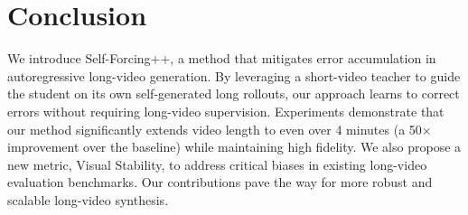 \section{Conclusion}
We introduce Self-Forcing++, a method that mitigates error accumulation in autoregressive long-video generation. By leveraging a short-video teacher to guide the student on its own self-generated long rollouts, our approach learns to correct errors without requiring long-video supervision. Experiments demonstrate that our method significantly extends video length to even over 4 minutes (a 50$\times$ improvement over the baseline) while maintaining high fidelity. We also propose a new metric, Visual Stability, to address critical biases in existing long-video evaluation benchmarks. Our contributions pave the way for more robust and scalable long-video synthesis.